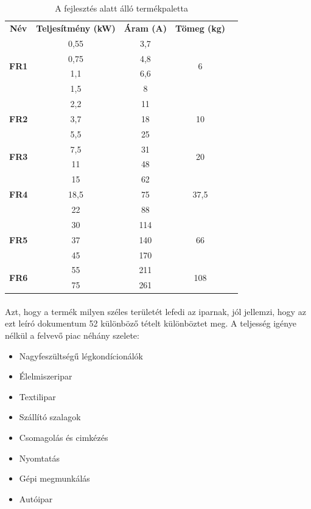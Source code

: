 \begin{table}[H]
\centering
\begin{tabular}{|c|c|c|c|l}
\cline{1-4}
\textbf{Név} & \textbf{Teljesítmény (kW)} & \textbf{Áram (A)} & \textbf{Tömeg (kg)} &  \\ \cline{1-4}
\multirow{4}{*}{\textbf{FR1}} & 0,55 & 3,7 & \multirow{4}{*}{6} &  \\ \cline{2-3}
 & 0,75 & 4,8 &  &  \\ \cline{2-3}
 & 1,1 & 6,6 &  &  \\ \cline{2-3}
 & 1,5 & 8 &  &  \\ \cline{1-4}
\multirow{3}{*}{\textbf{FR2}} & 2,2 & 11 & \multirow{3}{*}{10} &  \\ \cline{2-3}
 & 3,7 & 18 &  &  \\ \cline{2-3}
 & 5,5 & 25 &  &  \\ \cline{1-4}
\multirow{2}{*}{\textbf{FR3}} & 7,5 & 31 & \multirow{2}{*}{20} &  \\ \cline{2-3}
 & 11 & 48 &  &  \\ \cline{1-4}
\multirow{3}{*}{\textbf{FR4}} & 15 & 62 & \multirow{3}{*}{37,5} &  \\ \cline{2-3}
 & 18,5 & 75 &  &  \\ \cline{2-3}
 & 22 & 88 &  &  \\ \cline{1-4}
\multirow{3}{*}{\textbf{FR5}} & 30 & 114 & \multirow{3}{*}{66} &  \\ \cline{2-3}
 & 37 & 140 &  &  \\ \cline{2-3}
 & 45 & 170 &  &  \\ \cline{1-4}
\multirow{2}{*}{\textbf{FR6}} & 55 & 211 & \multirow{2}{*}{108} &  \\ \cline{2-3}
 & 75 & 261 &  &  \\ \cline{1-4}
\end{tabular}
\caption{A fejlesztés alatt álló termékpaletta}
\label{fig:family}
\end{table}

\paragraph{}
Azt, hogy a termék milyen széles területét lefedi az iparnak, jól jellemzi, hogy az ezt leíró dokumentum 52 különböző tételt különböztet meg. A teljesség igénye nélkül a felvevő piac néhány szelete:

\begin{itemize}
	\item{Nagyfeszültségű légkondícionálók}
	\item{Élelmiszeripar}
	\item{Textilipar}
	\item{Szállító szalagok}
	\item{Csomagolás és cimkézés}
	\item{Nyomtatás}
	\item{Gépi megmunkálás}
	\item{Autóipar}
\end{itemize}

